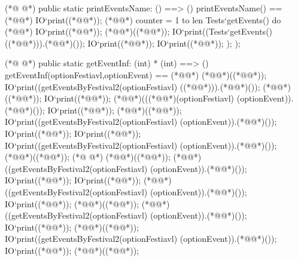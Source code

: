 \begin{vdmpp}[breaklines=true]
(*@
\label{printModels:60}
@*)
  public static printEventsName: () ==> ()
  printEventsName() ==
  (*@\vdmnotcovered{(}@*) 
  IO`print((*@@*));
   (*@@*) counter = 1 to len Tests`getEvents() do (*@\vdmnotcovered{(}@*)
   IO`print((*@@*));
   (*@@*)((*@@*));
   IO`print((Tests`getEvents() ((*@@*))).(*@@*)());
   IO`print((*@@*));
   IO`print((*@@*));
  );
 );  
 
(*@
\label{printUsers:73}
@*)
 public static getEventInf: (int) * (int) ==> ()
  getEventInf(optionFestiavl,optionEvent) ==
  (*@\vdmnotcovered{(}@*) 
  (*@@*)((*@@*));
   IO`print((getEventsByFestival2(optionFestiavl) ((*@@*))).(*@@*)());
   (*@@*)((*@@*));
   IO`print((*@@*));
   (*@@*)(((*@@*)(optionFestiavl) (optionEvent)).(*@@*)());
   IO`print((*@@*));
   (*@@*)((*@@*));
   IO`print((getEventsByFestival2(optionFestiavl) (optionEvent)).(*@@*)());
   IO`print((*@@*));
   IO`print((*@@*));
   IO`print((getEventsByFestival2(optionFestiavl) (optionEvent)).(*@@*)());
   (*@@*)((*@@*));
(*@
\label{main:88}
@*)
   (*@@*)((*@@*));
    (*@@*)((getEventsByFestival2(optionFestiavl) (optionEvent)).(*@@*)());
   IO`print((*@@*));
   IO`print((*@@*));
   (*@@*)((getEventsByFestival2(optionFestiavl) (optionEvent)).(*@@*)());
   IO`print((*@@*));
   (*@@*)((*@@*));
   (*@@*)((getEventsByFestival2(optionFestiavl) (optionEvent)).(*@@*)());
   IO`print((*@@*));
   (*@@*)((*@@*));
   IO`print((getEventsByFestival2(optionFestiavl) (optionEvent)).(*@@*)());
   IO`print((*@@*));
   (*@@*)((*@@*));
    

\end{vdmpp}
